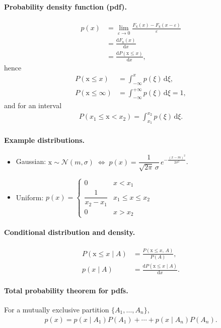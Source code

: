 \paragraph{Probability density function (pdf).}
\begin{align}
p(x) &= \lim_{\varepsilon\to 0}\frac{F_{\mathrm{x}}(x)-F_{\mathrm{x}}(x-\varepsilon)}{\varepsilon} \\
&= \frac{\mathrm{d}F_{\mathrm{x}}(x)}{\mathrm{d}x} \\
&= \frac{\mathrm{d}P(\mathrm{x}\le x)}{\mathrm{d}x},
\end{align}
hence
\begin{align}
P(\mathrm{x}\le x) &= \int_{-\infty}^{x} p(\xi)\,\mathrm{d}\xi, \\
P(\mathrm{x}\le\infty) &= \int_{-\infty}^{+\infty} p(\xi)\,\mathrm{d}\xi = 1,
\end{align}
and for an interval
\begin{align}
P(x_1\le \mathrm{x} < x_2) = \int_{x_1}^{x_2} p(\xi)\,\mathrm{d}\xi.
\end{align}

\paragraph{Example distributions.}
\begin{itemize}[itemsep=0.4em]
\item Gaussian: $\mathrm{x}\sim\mathcal{N}(m,\sigma) \;\Longleftrightarrow\; p(x) = \dfrac{1}{\sqrt{2\pi}\,\sigma}\,e^{-\frac{(x-m)^2}{2\sigma^2}}$.
\item Uniform: $p(x) = \begin{cases} 0 & x < x_1 \\[2pt] \dfrac{1}{x_2-x_1} & x_1\le x\le x_2 \\[4pt] 0 & x > x_2 \end{cases}$
\end{itemize}

\paragraph{Conditional distribution and density.}
\begin{align}
P(\mathrm{x}\le x\mid A) &= \frac{P(\mathrm{x}\le x,\, A)}{P(A)}, \\
p(x\mid A) &= \frac{\mathrm{d}P(\mathrm{x}\le x\mid A)}{\mathrm{d}x}.
\end{align}

\paragraph{Total probability theorem for pdfs.}
For a mutually exclusive partition $\{A_1,\dots,A_n\}$,
\begin{align}
p(x) = p(x\mid A_1)P(A_1) + \cdots + p(x\mid A_n)P(A_n).
\end{align}

